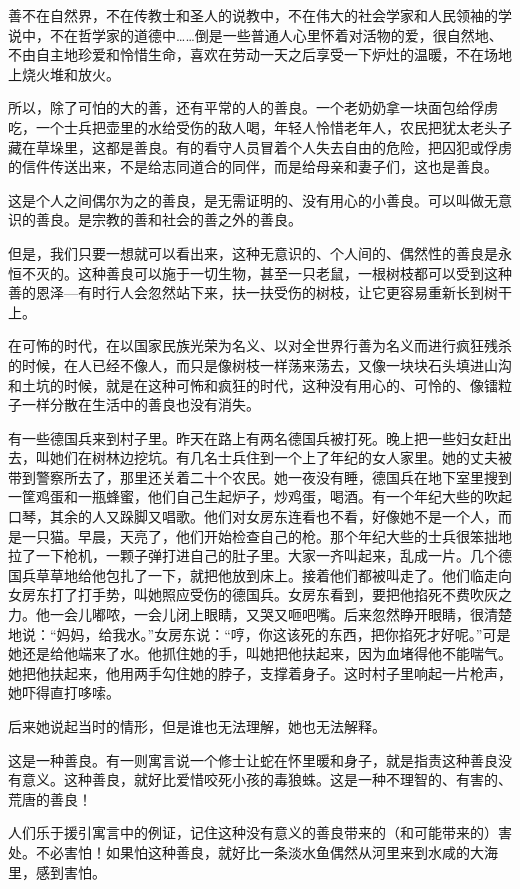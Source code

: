 善不在自然界，不在传教士和圣人的说教中，不在伟大的社会学家和人民领袖的学说中，不在哲学家的道德中……倒是一些普通人心里怀着对活物的爱，很自然地、不由自主地珍爱和怜惜生命，喜欢在劳动一天之后享受一下炉灶的温暖，不在场地上烧火堆和放火。

所以，除了可怕的大的善，还有平常的人的善良。一个老奶奶拿一块面包给俘虏吃，一个士兵把壶里的水给受伤的敌人喝，年轻人怜惜老年人，农民把犹太老头子藏在草垛里，这都是善良。有的看守人员冒着个人失去自由的危险，把囚犯或俘虏的信件传送出来，不是给志同道合的同伴，而是给母亲和妻子们，这也是善良。

这是个人之间偶尔为之的善良，是无需证明的、没有用心的小善良。可以叫做无意识的善良。是宗教的善和社会的善之外的善良。

但是，我们只要一想就可以看出来，这种无意识的、个人间的、偶然性的善良是永恒不灭的。这种善良可以施于一切生物，甚至一只老鼠，一根树枝都可以受到这种善的恩泽—有时行人会忽然站下来，扶一扶受伤的树枝，让它更容易重新长到树干上。

在可怖的时代，在以国家民族光荣为名义、以对全世界行善为名义而进行疯狂残杀的时候，在人已经不像人，而只是像树枝一样荡来荡去，又像一块块石头填进山沟和土坑的时候，就是在这种可怖和疯狂的时代，这种没有用心的、可怜的、像镭粒子一样分散在生活中的善良也没有消失。

有一些德国兵来到村子里。昨天在路上有两名德国兵被打死。晚上把一些妇女赶出去，叫她们在树林边挖坑。有几名士兵住到一个上了年纪的女人家里。她的丈夫被带到警察所去了，那里还关着二十个农民。她一夜没有睡，德国兵在地下室里搜到一筐鸡蛋和一瓶蜂蜜，他们自己生起炉子，炒鸡蛋，喝酒。有一个年纪大些的吹起口琴，其余的人又跺脚又唱歌。他们对女房东连看也不看，好像她不是一个人，而是一只猫。早晨，天亮了，他们开始检查自己的枪。那个年纪大些的士兵很笨拙地拉了一下枪机，一颗子弹打进自己的肚子里。大家一齐叫起来，乱成一片。几个德国兵草草地给他包扎了一下，就把他放到床上。接着他们都被叫走了。他们临走向女房东打了打手势，叫她照应受伤的德国兵。女房东看到，要把他掐死不费吹灰之力。他一会儿嘟哝，一会儿闭上眼睛，又哭又咂吧嘴。后来忽然睁开眼睛，很清楚地说：“妈妈，给我水。”女房东说：“哼，你这该死的东西，把你掐死才好呢。”可是她还是给他端来了水。他抓住她的手，叫她把他扶起来，因为血堵得他不能喘气。她把他扶起来，他用两手勾住她的脖子，支撑着身子。这时村子里响起一片枪声，她吓得直打哆嗦。

后来她说起当时的情形，但是谁也无法理解，她也无法解释。

这是一种善良。有一则寓言说一个修士让蛇在怀里暖和身子，就是指责这种善良没有意义。这种善良，就好比爱惜咬死小孩的毒狼蛛。这是一种不理智的、有害的、荒唐的善良！

人们乐于援引寓言中的例证，记住这种没有意义的善良带来的（和可能带来的）害处。不必害怕！如果怕这种善良，就好比一条淡水鱼偶然从河里来到水咸的大海里，感到害怕。


